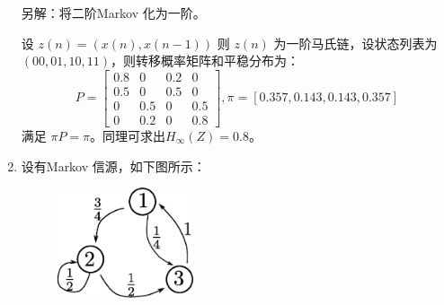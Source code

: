 \documentclass[a4paper]{article}
\begin{document}
\begin{enumerate}[label=\thehwcnt.\arabic*.]
\begin{solution}
另解：将二阶Markov 化为一阶。

设 $z(n) = (x(n), x(n-1))$ 则 $z(n)$ 为一阶马氏链，设状态列表为$(00,01,10,11)$，则转移概率矩阵和平稳分布为：
$$
P = \begin{bmatrix}
0.8 & 0 & 0.2 & 0 \\
0.5 & 0 & 0.5 & 0 \\
0 & 0.5 & 0 & 0.5 \\
0 & 0.2 & 0 & 0.8 
\end{bmatrix},\pi = [ 0.357, 0.143, 0.143, 0.357]
$$
满足 $\pi P = \pi$。同理可求出$H_{\infty}(Z) = 0.8$。
\end{solution}
\item 设有Markov 信源，如下图所示：

\begin{figure}[!ht]
\centering
\includegraphics[width=4cm]{H3_2.eps}
\end{figure}


\end{enumerate}
\end{document}
